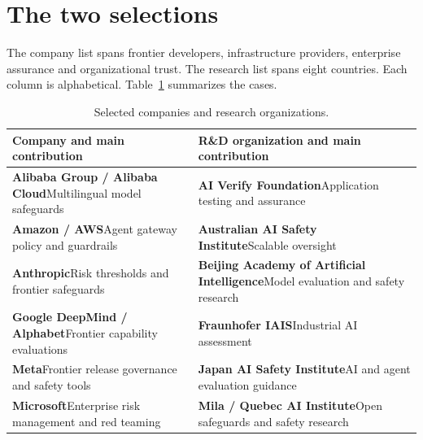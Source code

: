 
\section*{The two selections}
{}

The company list spans frontier developers, infrastructure providers, enterprise assurance and organizational trust. The research list spans eight countries. Each column is alphabetical. Table~\ref{tab:selections} summarizes the cases.

\begin{table}[!htbp]
  \centering
  \caption{Selected companies and research organizations.}
  \label{tab:selections}
  \small
\begin{tabularx}{\linewidth}{@{}>{\RaggedRight\arraybackslash}X>{\RaggedRight\arraybackslash}X@{}}
\toprule
\textbf{Company and main contribution} & \textbf{R\&D organization and main contribution} \\
\midrule
\textbf{Alibaba Group / Alibaba Cloud}\newline Multilingual model safeguards & \textbf{AI Verify Foundation}\newline Application testing and assurance \\[0.35em]
\textbf{Amazon / AWS}\newline Agent gateway policy and guardrails & \textbf{Australian AI Safety Institute}\newline Scalable oversight \\[0.35em]
\textbf{Anthropic}\newline Risk thresholds and frontier safeguards & \textbf{Beijing Academy of Artificial Intelligence}\newline Model evaluation and safety research \\[0.35em]
\textbf{Google DeepMind / Alphabet}\newline Frontier capability evaluations & \textbf{Fraunhofer IAIS}\newline Industrial AI assessment \\[0.35em]
\textbf{Meta}\newline Frontier release governance and safety tools & \textbf{Japan AI Safety Institute}\newline AI and agent evaluation guidance \\[0.35em]
\textbf{Microsoft}\newline Enterprise risk management and red teaming & \textbf{Mila / Quebec AI Institute}\newline Open safeguards and safety research \\[0.35em]

\end{tabularx}
\end{table}
